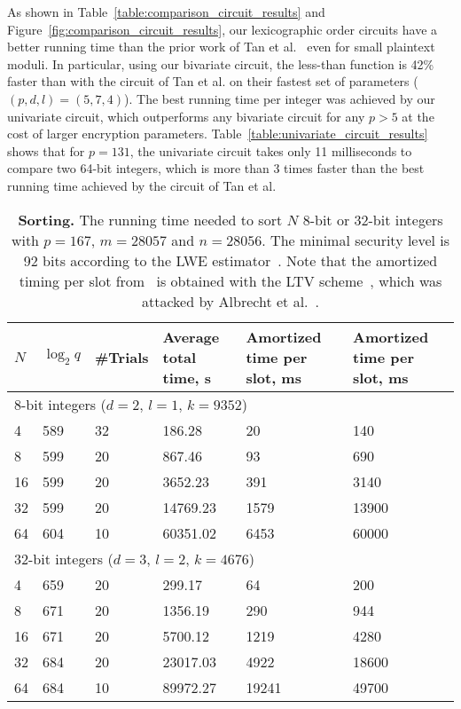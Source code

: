 As shown in Table~\ref{table:comparison_circuit_results} and Figure~\ref{fig:comparison_circuit_results}, our lexicographic order circuits have a better running time than the prior work of Tan et al.~\cite{TLWRK20} even for small plaintext moduli.
In particular, using our bivariate circuit, the less-than function is 42\% faster than with the circuit of Tan et al. on their fastest set of parameters ($(p,d,l) = (5,7,4)$).
The best running time per integer was achieved by our univariate circuit, which outperforms any bivariate circuit for any $p > 5$ at the cost of larger encryption parameters.
Table~\ref{table:univariate_circuit_results} shows that for $p=131$, the univariate circuit takes only 11 milliseconds to compare two 64-bit integers, which is more than 3 times faster than the best running time achieved by the circuit of Tan et al.

\begin{table}[h]
  \centering
  \begin{tabular*}{.45\textwidth}{ p{0.3cm} p{0.7cm} p{0.8cm} p{1cm} p{1.3cm} p{1.5cm}}
    \toprule
    $N$     & $\log_2 q$    & \#Trials  & Average total time, s & Amortized time per slot, ms & Amortized time per slot, ms~\cite{CDSS15} \\
    \midrule
    \multicolumn{6}{l}{8-bit integers ($d=2$, $l=1$, $k=9352$)} \\
    \cmidrule(lr){1-6}
    4       & 589     & 32        & 186.28       & 20    & 140 \\
    8       & 599     & 20        & 867.46       & 93    & 690 \\
    16      & 599     & 20        & 3652.23      & 391   & 3140\\
    32      & 599     & 20        & 14769.23     & 1579  & 13900 \\
    64      & 604     & 10        & 60351.02     & 6453  & 60000 \\
    \midrule
    \multicolumn{6}{l}{32-bit integers ($d=3$, $l=2$, $k=4676$)} \\
    \cmidrule(lr){1-6}
    4       & 659     & 20        & 299.17       & 64    & 200 \\
    8       & 671     & 20        & 1356.19      & 290   & 944 \\
    16      & 671     & 20        & 5700.12      & 1219  & 4280 \\
    32      & 684     & 20        & 23017.03     & 4922  & 18600 \\
    64      & 684     & 10        & 89972.27     & 19241 & 49700 \\
    \bottomrule
  \end{tabular*}
  \caption{\textbf{Sorting.} The running time needed to sort $N$ 8-bit or 32-bit integers with $p=167$, $m=28057$ and $n=28056$. The minimal security level is 92 bits according to the LWE estimator~\cite{lwe_estimator}. Note that the amortized timing per slot from~\cite{CDSS15} is obtained with the LTV scheme~\cite{STOC:LopTroVai12}, which was attacked by Albrecht et al.~\cite{C:AlbBaiDuc16}.}
  \label{table:sorting_circuit_results}
\end{table}

